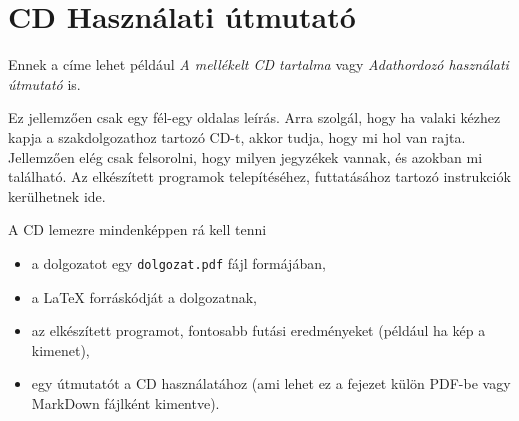 \pagestyle{empty}

\section*{CD Használati útmutató}

Ennek a címe lehet például \textit{A mellékelt CD tartalma} vagy \textit{Adathordozó használati útmutató} is.

Ez jellemzően csak egy fél-egy oldalas leírás.
Arra szolgál, hogy ha valaki kézhez kapja a szakdolgozathoz tartozó CD-t, akkor tudja, hogy mi hol van rajta.
Jellemzően elég csak felsorolni, hogy milyen jegyzékek vannak, és azokban mi található.
Az elkészített programok telepítéséhez, futtatásához tartozó instrukciók kerülhetnek ide.

A CD lemezre mindenképpen rá kell tenni
\begin{itemize}
\item a dolgozatot egy \texttt{dolgozat.pdf} fájl formájában,
\item a LaTeX forráskódját a dolgozatnak,
\item az elkészített programot, fontosabb futási eredményeket (például ha kép a kimenet),
\item egy útmutatót a CD használatához (ami lehet ez a fejezet külön PDF-be vagy MarkDown fájlként kimentve).
\end{itemize}
